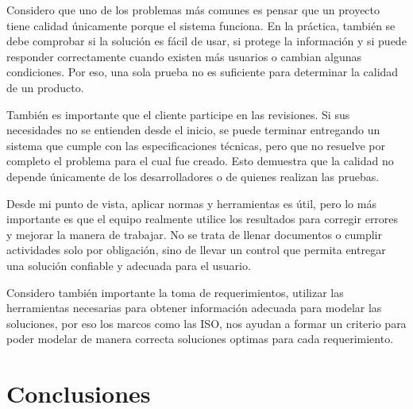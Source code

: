 \documentclass[12pt]{article}
\begin{document}
Considero que uno de los problemas más comunes es pensar que un proyecto tiene
calidad únicamente porque el sistema funciona. En la práctica, también se debe comprobar si la solución es fácil de usar, si protege la información y si puede responder correctamente cuando existen más usuarios o cambian algunas condiciones. Por eso, una sola prueba no es suficiente para determinar la calidad de un producto.

También es importante que el cliente participe en las revisiones. Si
sus necesidades no se entienden desde el inicio, se puede terminar entregando
un sistema que cumple con las especificaciones técnicas, pero que no resuelve
por completo el problema para el cual fue creado. Esto demuestra que la
calidad no depende únicamente de los desarrolladores o de quienes realizan
las pruebas.

Desde mi punto de vista, aplicar normas y herramientas es útil, pero lo más
importante es que el equipo realmente utilice los resultados para corregir
errores y mejorar la manera de trabajar. No se trata de llenar documentos o
cumplir actividades solo por obligación, sino de llevar un control que permita
entregar una solución confiable y adecuada para el usuario.

Considero también importante la toma de requerimientos, utilizar las herramientas necesarias para obtener información adecuada para modelar las soluciones, por eso los marcos como las ISO, nos ayudan a formar un criterio para poder modelar de manera correcta soluciones optimas para cada requerimiento.

\section*{Conclusiones}
\end{document}
